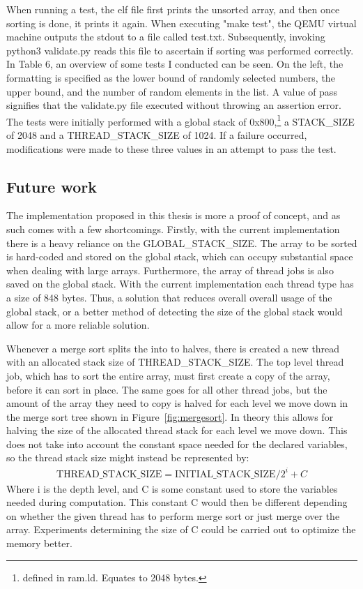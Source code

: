 When running a test, the elf file first prints the unsorted array, and then once
sorting is done, it prints it again. When executing "make test", the QEMU
virtual machine outputs the stdout to a file called test.txt. Subsequently,
invoking python3 validate.py reads this file to ascertain if sorting was
performed correctly. In Table 6, an overview of some tests I conducted can be
seen. On the left, the formatting is specified as the lower bound of randomly
selected numbers, the upper bound, and the number of random elements in the
list. A value of pass signifies that the validate.py file executed without
throwing an assertion error. The tests were initially performed with a global
stack of 0x800,\footnote{defined in ram.ld. Equates to 2048 bytes.} a
STACK\_SIZE of 2048 and a THREAD\_STACK\_SIZE of 1024. If a failure occurred,
modifications were made to these three values in an attempt to pass the test.

\subsection{Future work}
The implementation proposed in this thesis is more a proof of concept, and as
such comes with a few shortcomings. Firstly, with the current implementation
there is a heavy reliance on the GLOBAL\_STACK\_SIZE. The array to be sorted is
hard-coded and stored on the global stack, which can occupy substantial space
when dealing with large arrays. Furthermore, the array of thread jobs is also
saved on the global stack. With the current implementation each thread type has
a size of 848 bytes. Thus, a solution that reduces overall overall usage of the
global stack, or a better method of detecting the size of the global stack would
allow for a more reliable solution.

Whenever a merge sort splits the into to halves, there is created a new thread
with an allocated stack size of THREAD\_STACK\_SIZE. The top level thread job,
which has to sort the entire array, must first create a copy of the array, before
it can sort in place. The same goes for all other thread jobs, but the amount of
the array they need to copy is halved for each level we move down in the
merge sort tree shown in Figure~\ref{fig:mergesort}. In theory this allows for
halving the size of the allocated thread stack for each level we move down. This
does not take into account the constant space needed for the declared variables,
so the thread stack size might instead be represented by:
\begin{align}
  \text{THREAD\_STACK\_SIZE} = \text{INITIAL\_STACK\_SIZE} / 2^i + C
\end{align}
Where i is the depth level, and C is some constant used to store the variables
needed during computation. This constant C would then be different depending on
whether the given thread has to perform merge sort or just merge over the array.
Experiments determining the size of C could be carried out to optimize the
memory better.

